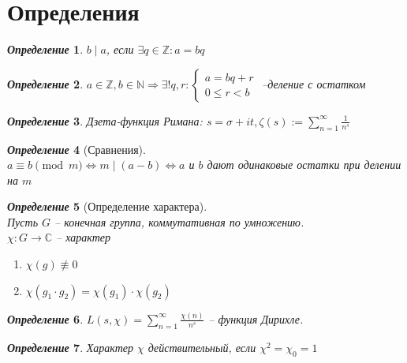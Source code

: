 \documentclass[a4paper,12pt]{article}
\newtheorem{deff2}{\textit{Определение}}
\newcommand{\ee}{\equiv}
\newcommand{\q}{\quad}
\newcommand{\bb}[1]{\mathbb{#1}}
\newcommand{\SL}{\sum\limits}
\begin{document}
\section{Определения}
\begin{formbox}{}
\begin{deff2} $b\mid a$, если $\exists q\in \mathbb{Z}: a=bq$
\end{deff2}
\end{formbox}
\begin{formbox}{}
\begin{deff2} $a\in \bb{Z}, b\in\bb{N}\Rightarrow \exists ! q,r: \begin{cases} a = bq+r\\0 \le r < b\end{cases} $ --деление с остатком
\end{deff2}
\end{formbox}
\begin{formbox}{}
\begin{deff2}
Дзета-функция Римана: $s = \sigma + it, \zeta (s) := \SL_{n=1}^\infty \frac{1}{n^s}$
\end{deff2}
\end{formbox}
\begin{formbox}{}
\begin{deff2}[Сравнения]\q\\
$a \ee b \pmod{m}\iff m\mid (a-b) \iff a$ и $b$ дают одинаковые остатки при делении на $m$
\end{deff2}
\end{formbox}
\begin{formbox}{}
\begin{deff2} [Определение характера]\q\\
Пусть $G$ -- конечная группа, коммутативная по умножению.\\
$\chi:G\to\bb{C}$ -- характер
\begin{enumerate}
\item $\chi(g) \not\ee0 $
\item $\chi(g_1 \cdot g_2) = \chi(g_1)\cdot \chi(g_2)  $
\end{enumerate}
\end{deff2}
\end{formbox}
\begin{formbox}{}
\begin{deff2}
$L(s,\chi) = \SL_{n=1}^\infty \frac{\chi(n)}{n^s}$ -- функция Дирихле.
\end{deff2}
\end{formbox}
\begin{formbox}{}
\begin{deff2} Характер $\chi$ действительный, если $\chi^2 = \chi_0 = 1$
\end{deff2}
\end{formbox}
\end{document}
